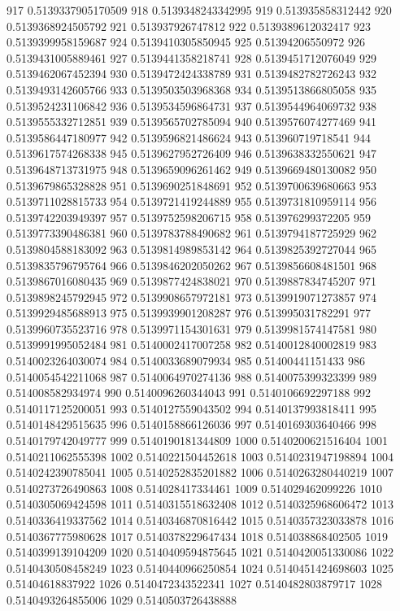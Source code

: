 917 0.5139337905170509
918 0.5139348243342995
919 0.513935858312442
920 0.5139368924505792
921 0.513937926747812
922 0.5139389612032417
923 0.5139399958159687
924 0.5139410305850945
925 0.51394206550972
926 0.5139431005889461
927 0.5139441358218741
928 0.5139451712076049
929 0.5139462067452394
930 0.5139472424338789
931 0.5139482782726243
932 0.5139493142605766
933 0.5139503503968368
934 0.5139513866805058
935 0.5139524231106842
936 0.5139534596864731
937 0.5139544964069732
938 0.5139555332712851
939 0.5139565702785094
940 0.5139576074277469
941 0.5139586447180977
942 0.5139596821486624
943 0.513960719718541
944 0.5139617574268338
945 0.5139627952726409
946 0.5139638332550621
947 0.5139648713731975
948 0.5139659096261462
949 0.5139669480130082
950 0.5139679865328828
951 0.5139690251848691
952 0.5139700639680663
953 0.5139711028815733
954 0.5139721419244889
955 0.5139731810959114
956 0.5139742203949397
957 0.5139752598206715
958 0.513976299372205
959 0.5139773390486381
960 0.5139783788490682
961 0.5139794187725929
962 0.5139804588183092
963 0.5139814989853142
964 0.5139825392727044
965 0.5139835796795764
966 0.5139846202050262
967 0.5139856608481501
968 0.5139867016080435
969 0.5139877424838021
970 0.5139887834745207
971 0.5139898245792945
972 0.5139908657972181
973 0.5139919071273857
974 0.5139929485688913
975 0.5139939901208287
976 0.513995031782291
977 0.5139960735523716
978 0.5139971154301631
979 0.5139981574147581
980 0.5139991995052484
981 0.5140002417007258
982 0.5140012840002819
983 0.5140023264030074
984 0.5140033689079934
985 0.51400441151433
986 0.5140054542211068
987 0.5140064970274136
988 0.5140075399323399
989 0.514008582934974
990 0.5140096260344043
991 0.5140106692297188
992 0.5140117125200051
993 0.5140127559043502
994 0.5140137993818411
995 0.5140148429515635
996 0.5140158866126036
997 0.5140169303640466
998 0.5140179742049777
999 0.5140190181344809
1000 0.5140200621516404
1001 0.5140211062555398
1002 0.5140221504452618
1003 0.5140231947198894
1004 0.5140242390785041
1005 0.5140252835201882
1006 0.5140263280440219
1007 0.5140273726490863
1008 0.514028417334461
1009 0.514029462099226
1010 0.5140305069424598
1011 0.5140315518632408
1012 0.5140325968606472
1013 0.5140336419337562
1014 0.5140346870816442
1015 0.5140357323033878
1016 0.5140367775980628
1017 0.5140378229647434
1018 0.514038868402505
1019 0.5140399139104209
1020 0.5140409594875645
1021 0.5140420051330086
1022 0.5140430508458249
1023 0.5140440966250854
1024 0.5140451424698603
1025 0.51404618837922
1026 0.5140472343522341
1027 0.5140482803879717
1028 0.5140493264855006
1029 0.5140503726438888
